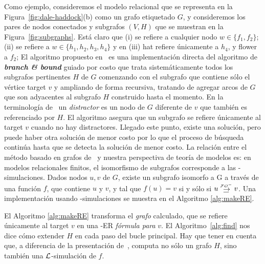 Como ejemplo, consideremos el modelo relacional que se representa en la
Figura~\ref{fig:dale-haddock}(b) como un grafo etiquetado $G$, y consideremos los pares de nodos conectados y subgrafos $(V, H)$ que se muestran en 
la Figura~\ref{fig:subgraphs}. Est\'a claro que (i) se refiere a cualquier nodo $w\in\{f_1,f_2\}$; (ii) se refiere a $w\in\{h_1,h_2,h_3,h_4\}$
y en (iii) hat refiere \'unicamente a $h_4$, y flower a $f_2$; 
El algoritmo propuesto en~\cite{graph} es una
implementaci\'on directa del algoritmo de {\bf \emph{branch \& bound}} guiado por costo que trata sistem\'aticamente todos los
subgrafos pertinentes $H$ de $G$ comenzando con el subgrafo
que contiene s\'olo el v\'ertice target $v$ y ampliando de forma recursiva, tratando de
agregar arcos de $G$ que son adyacentes al subgrafo $H$ construido
hasta el momento. En la terminolog\'ia de~\cite{graph} un {\em distractor} es un nodo de $G$ diferente de
$v$ que tambi\'en es referenciado por $H$.
El algoritmo asegura que un subgrafo se refiere \'unicamente al target $v$ cuando no hay distractores. Llegado este punto, existe una
soluci\'on, pero puede haber otra
soluci\'on de menor costo por lo que el proceso de b\'usqueda contin\'ua hasta que
se detecta la soluci\'on de menor costo. 
La relaci\'on entre el m\'etodo basado en grafos
de~\cite{graph} y nuestra perspectiva de teor\'ia de modelos es: en
modelos relacionales finitos, el isomorfismo de subgrafos corresponde a las
\EPFOL-simulaciones. Dados nodos $u,v$ de
$G$, existe un subgrafo isomorfo a G a trav\'es de una funci\'on $f$, que contiene $ u $ y
$v$, y tal que $f(u)=v$ si y s\'olo si $u \simul{\+\EPFOL} v$. Una implementaci\'on usando \EPFOL-simulaciones se muestra en el Algoritmo \ref{alg:makeRE}.

El Algoritmo \ref{alg:makeRE} transforma el {\em grafo} calculado, que se refiere \'unicamente al target $v$ en una \EPFOL-ER {\em
f\'ormula para} $v$. El Algoritmo~\ref{alg:find} nos dice c\'omo extender $H$ en cada paso
del bucle principal. Hay que tener en cuenta que, a diferencia de la
presentaci\'on de~\cite{graph},  computa
no s\'olo un grafo $H$, sino tambi\'en una $\mathcal{L}$-simulaci\'on de $f$.

